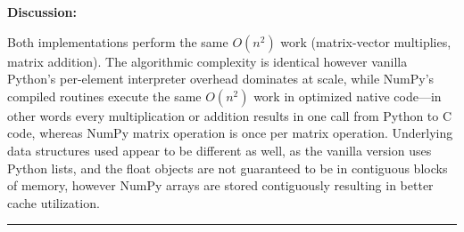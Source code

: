 \documentclass{article}
\begin{document}
\begin{aprob}
    \medskip
    \textbf{Discussion:}

    Both implementations perform the same $O(n^2)$ work (matrix-vector multiplies, matrix addition). The algorithmic complexity is identical however vanilla Python's per-element interpreter overhead dominates at scale, while NumPy's compiled routines execute the same $O(n^2)$ work in optimized native code---in other words every multiplication or addition results in one call from Python to C code, whereas NumPy matrix operation is once per matrix operation. Underlying data structures used appear to be different as well, as the vanilla version uses Python lists, and the float objects are not guaranteed to be in contiguous blocks of memory, however NumPy arrays are stored contiguously resulting in better cache utilization.

\end{aprob}

\noindent\rule{\textwidth}{0.4pt}
\end{document}
